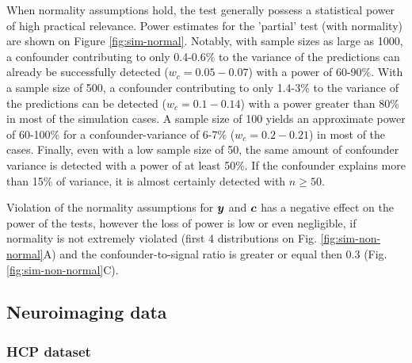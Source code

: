\documentclass{article}
\begin{document}
When normality assumptions hold, the test generally possess a statistical power of high practical relevance. Power estimates for the 'partial' test (with normality) are shown on Figure \ref{fig:sim-normal}. Notably, with sample sizes as large as 1000, a confounder contributing to only 0.4-0.6\% to the variance of the predictions can already be successfully detected ($w_c = 0.05 - 0.07$) with a power of 60-90\%. With a sample size of 500, a confounder contributing to only 1.4-3\% to the variance of the predictions can be detected ($w_c = 0.1 - 0.14$) with a power greater than 80\% in most of the simulation cases. A sample size of 100 yields an approximate power of 60-100\% for a confounder-variance of 6-7\% ($w_c = 0.2 - 0.21$) in most of the cases. Finally, even with a low sample size of 50, the same amount of confounder variance is detected with a power of at least 50\%. If the confounder explains more than 15\% of variance, it is almost certainly detected with $n \geq 50$.

Violation of the normality assumptions for $\boldsymbol{y}$ and $\boldsymbol{c}$ has a negative effect on the power of the tests, however the loss of power is low or even negligible, if normality is not extremely violated (first 4 distributions on Fig. \ref{fig:sim-non-normal}A) and the confounder-to-signal ratio is greater or equal then 0.3 (Fig. \ref{fig:sim-non-normal}C).

\subsection{Neuroimaging data}
\subsubsection*{HCP dataset}
\end{document}
